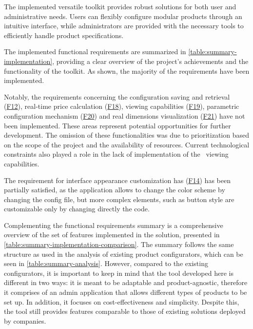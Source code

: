 The implemented versatile toolkit provides robust solutions for both user and administrative needs. Users can flexibly configure modular products through an intuitive interface, while administrators are provided with the necessary tools to efficiently handle product specifications.

The implemented functional requirements are summarized in \autoref{table:summary-implementation}, providing a clear overview of the project's achievements and the functionality of the toolkit. As shown, the majority of the requirements have been implemented.

Notably, the requirements concerning the configuration saving and retrieval (\hyperref[itm:F12]{F12}), real-time price calculation (\hyperref[itm:F18]{F18}),  viewing capabilities (\hyperref[itm:F19]{F19}), parametric configuration mechanism (\hyperref[itm:F20]{F20}) and real dimensions visualization (\hyperref[itm:F21]{F21}) have not been implemented. These areas represent potential opportunities for further development. The omission of these functionalities was due to prioritization based on the scope of the project and the availability of resources. Current technological constraints also played a role in the lack of implementation of the~ viewing capabilities.

The requirement for interface appearance customization has (\hyperref[itm:F14]{F14}) has been partially satisfied, as the application allows to change the color scheme by changing the config file, but more complex elements, such as button style are customizable only by changing directly the  code.

Complementing the functional requirements summary is a comprehensive overview of the set of features implemented in the solution, presented in \autoref{table:summary-implementation-comparison}. The summary follows the same structure as used in the analysis of existing product configurators, which can be seen in \autoref{table:summary-analysis}. However, compared to the existing configurators, it is important to keep in mind that the tool developed here is different in two ways: it is meant to be adaptable and product-agnostic, therefore it comprises of an admin application that allows different types of products to be set up. In addition, it focuses on cost-effectiveness and simplicity. Despite this, the tool still provides features comparable to those of existing solutions deployed by companies.


